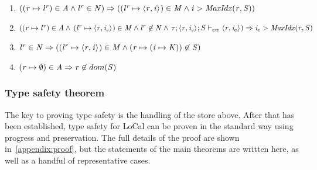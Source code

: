 \documentclass[showabstract,showacknowledgments,showpreface,showdedication,school]{iuphd}
\theoremstyle{nonumberplain}
\newcommand{\sysname}[0]{LoCal\xspace}
\newcommand{\ourcalc}[0]{\sysname}
\newcommand{\keywd}[1]{\mathit{#1}}
\newcommand{\skeywd}[1]{\mathit{#1}}
\newcommand{\DC}{\keywd{K}}
\newcommand{\TYP}{\keywd{\tau}}
\newcommand{\var}{\svar}
\newcommand{\svar}{x}
\newcommand{\loc}{\skeywd{l}}
\newcommand{\concreteloc}[3]{\ensuremath{\langle #1, #2 \rangle ^{#3}}}
\newcommand{\reg}{\skeywd{r}}
\newcommand{\ind}{\keywd{i}}
\newcommand{\VAL}{\keywd{v}}
\newcommand{\STOR}{\keywd{S}}
\newcommand{\MENV}{\keywd{M}}
\newcommand{\AENV}{\keywd{A}}
\newcommand{\NENV}{\keywd{N}}
\newcommand{\locreg}[2]{\ensuremath{{#1}^{#2}}}
\newcommand{\subst}[3]{\ensuremath{#1[#3/#2]}}
\newcommand{\allocptr}[2]{\keywd{MaxIdx}(#1,#2)}
\newcommand{\ewitness}[4]{\ensuremath{#1;#2;#3 \vdash_{ew} #4}}
\newcommand{\overharpoon}[1]{\overrightharpoon{#1}}
\begin{document}
\begin{enumerate}
    \item \label{wf:impl-linear-alloc} $ ((\reg \mapsto \locreg{\loc}{\reg}) \in \AENV \wedge \locreg{\loc}{\reg} \in \NENV) \Rightarrow \\
          ((\locreg{\loc}{\reg} \mapsto \concreteloc{\reg}{\ind}{}) \in \MENV \wedge
\ind > \allocptr{\reg}{\STOR})
          $

    \item \label{wf:impl-linear-alloc2} $ ((\reg \mapsto \locreg{\loc}{\reg}) \in \AENV \wedge
    \, (\locreg{\loc}{\reg} \mapsto \concreteloc{\reg}{\ind_s}{}) \in \MENV \wedge \locreg{\loc}{\reg} \not \in \NENV \wedge
    \, \ewitness{\TYP}{\concreteloc{\reg}{\ind_s}{}}{\STOR}{\concreteloc{\reg}{\ind_e}{}}) \Rightarrow \\
          \ind_e > \allocptr{\reg}{\STOR}
          $

    \item \label{wf:impl-write-once} $ \locreg{\loc}{\reg} \in \NENV \Rightarrow \\
          ((\locreg{\loc}{\reg} \mapsto \concreteloc{\reg}{\ind}{}) \in \MENV \wedge \\
          (\reg \mapsto (\ind \mapsto \DC)) \not \in \STOR)
          $

    \item \label{wf:impl-empty-region} $(\reg \mapsto \emptyset) \in \AENV \Rightarrow \\
    \reg \not \in dom(\STOR)$
\end{enumerate}



\subsubsection{Type safety theorem}

The key to proving type safety is the handling of the store above. After that has been
established, type safety for \ourcalc{} can be proven in the standard way using
progress and preservation. The full details of the proof are shown in~\ref{appendix:proof},
but the statements of the main theorems are written here, as well as a handful
of representative cases.

\newcommand{\substlemmasubsts}[1]{\subst{#1}{\overharpoon{\var}}{\overharpoon{\VAL}} \subst{}{\overharpoon{\locreg{\loc}{\reg}}}{\overharpoon{\locreg{\loc'}{\reg'}}} \subst{}{\locreg{\loc}{\reg}}{\locreg{\loc'}{\reg'}}}
\end{document}
